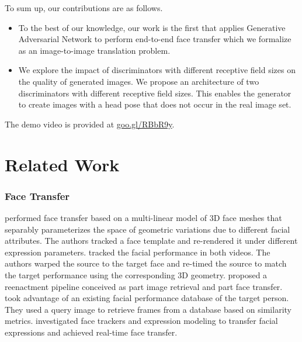 \documentclass[letterpaper]{article} %
\begin{document}
	
	To sum up, our contributions are as follows.
	\begin{itemize}
		\item To the best of our knowledge, our work is the first that applies Generative Adversarial Network to perform end-to-end face transfer which we formalize as an image-to-image translation problem.
		\item We explore the impact of discriminators with different receptive field sizes on the quality of generated images. We propose an architecture of two discriminators with different receptive field sizes. This enables the generator to create images with a head pose that does not occur in the real image set.%
	\end{itemize}
	
	The demo video is provided at \url{goo.gl/RBbR9y}.
	
	\section{Related Work}
	\subsubsection{Face Transfer}
	\cite{vlasic2005face} performed face transfer based on a multi-linear model of 3D face meshes that separably parameterizes the space of geometric variations due to different facial attributes. The authors tracked a face template and re-rendered it under different expression parameters. \cite{dale2011video} tracked the facial performance in both videos. The authors warped the source to the target face and re-timed the source to match the target performance using the corresponding 3D geometry. \cite{garrido2014automatic} proposed a reenactment pipeline conceived as part image retrieval and part face transfer. \cite{li2012data} took advantage of an existing facial performance database of the target person. They used a query image to retrieve frames from a database based on similarity metrics. \cite{thies2016face2face} investigated face trackers and expression modeling to transfer facial expressions and achieved real-time face transfer. 
	
\end{document}
